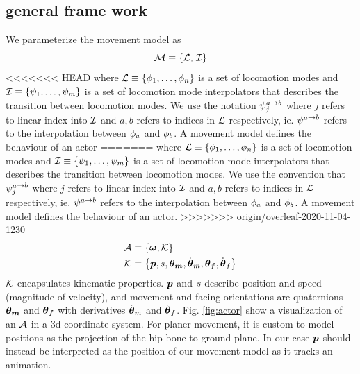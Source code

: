 \subsection{general frame work}
We parameterize the movement model as 
\begin{equation}
    \label{eq:model:parameterization}
 \mathcal{M} \equiv 
 \left\{ \mathcal{L},\,\mathcal{I} \right\}
\end{equation}
<<<<<<< HEAD
where $\mathcal{L} \equiv \left\{  \phi_1, \ldots, \phi_n \right\}$ is a set of locomotion modes and $\mathcal{I} \equiv \left\{  \psi_1, \ldots, \psi_m \right\}$ is a set of locomotion mode interpolators that describes the transition between locomotion modes. We use the notation $\psi_j^{a\rightarrow b}$ where $j$ refers to linear index into $\mathcal{I}$ and $a,b$ refers to indices in $\mathcal{L}$ respectively, ie. $\psi^{a\rightarrow b}$ refers to the interpolation between $\phi_a$ and $\phi_b$. A movement model defines the behaviour of an actor 
=======
where $\mathcal{L} \equiv \left\{  \phi_1, \ldots, \phi_n \right\}$ is a set of locomotion modes and $\mathcal{I} \equiv \left\{  \psi_1, \ldots, \psi_m \right\}$ is a set of locomotion mode interpolators that describes the transition between locomotion modes. We use the convention that $\psi_j^{a\rightarrow b}$ where $j$ refers to linear index into $\mathcal{I}$ and $a,b$ refers to indices in $\mathcal{L}$ respectively, ie. $\psi^{a\rightarrow b}$ refers to the interpolation between $\phi_a$ and $\phi_b$. A movement model defines the behaviour of an actor. 
>>>>>>> origin/overleaf-2020-11-04-1230
\begin{subequations}
\begin{align}
    \label{eq:actor:def}
    \mathcal{A} 
    &\equiv
    \left\{ 
        \boldsymbol{\omega }, \mathcal{K} 
         \right\}\\
    \mathcal{K}
    &\equiv
    \left\{ 
        \boldsymbol{p }, s, \boldsymbol{\theta_m }, \dot{\boldsymbol{\theta }}_m, {\boldsymbol{\theta_f }}, \dot{\boldsymbol{\theta }}_f 
         \right\}
\end{align}
\end{subequations}
$\mathcal{K}$ encapsulates kinematic properties. $\boldsymbol{p }$ and $s$ describe position and speed (magnitude of velocity), and movement and facing orientations are quaternions $\boldsymbol{\theta_m }$ and ${\boldsymbol{\theta_f }}$ with derivatives $\dot{\boldsymbol{\theta }}_m$ and $\dot{\boldsymbol{\theta }}_f$. Fig. \ref{fig:actor} show a visualization of an $\mathcal{A}$ in a 3d coordinate system. For planer movement, it is custom to model positions as the projection of the hip bone to ground plane. In our case $\boldsymbol{p }$ should instead be interpreted as the position of our movement model as it tracks an animation.  
